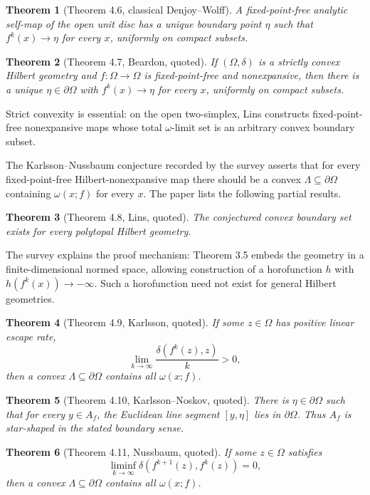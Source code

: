 \documentclass[11pt]{article}
\newtheorem{theorem}{Theorem}
\begin{document}
\begin{theorem}[Theorem 4.6, classical Denjoy--Wolff]
A fixed-point-free analytic self-map of the open unit disc has a unique boundary point
\(\eta\) such that \(f^k(x)\to\eta\) for every \(x\), uniformly on compact subsets.
\end{theorem}

\begin{theorem}[Theorem 4.7, Beardon, quoted]
If \((\Omega,\delta)\) is a strictly convex Hilbert geometry and
\(f:\Omega\to\Omega\) is fixed-point-free and nonexpansive, then there is a unique
\(\eta\in\partial\Omega\) with \(f^k(x)\to\eta\) for every \(x\), uniformly on compact subsets.
\end{theorem}
Strict convexity is essential: on the open two-simplex, Lins constructs fixed-point-free
nonexpansive maps whose total \(\omega\)-limit set is an arbitrary convex boundary subset.

The Karlsson--Nussbaum conjecture recorded by the survey asserts that for every fixed-point-free
Hilbert-nonexpansive map there should be a convex \(\Lambda\subseteq\partial\Omega\) containing
\(\omega(x;f)\) for every \(x\).  The paper lists the following partial results.

\begin{theorem}[Theorem 4.8, Lins, quoted]
The conjectured convex boundary set exists for every polytopal Hilbert geometry.
\end{theorem}
The survey explains the proof mechanism: Theorem 3.5 embeds the geometry in a finite-dimensional
normed space, allowing construction of a horofunction \(h\) with
\(h(f^k(x))\to-\infty\).  Such a horofunction need not exist for general Hilbert geometries.

\begin{theorem}[Theorem 4.9, Karlsson, quoted]
If some \(z\in\Omega\) has positive linear escape rate,
\[
 \lim_{k\to\infty}\frac{\delta(f^k(z),z)}k>0,
\]
then a convex \(\Lambda\subseteq\partial\Omega\) contains all \(\omega(x;f)\).
\end{theorem}

\begin{theorem}[Theorem 4.10, Karlsson--Noskov, quoted]
There is \(\eta\in\partial\Omega\) such that for every \(y\in A_f\), the Euclidean line segment
\([y,\eta]\) lies in \(\partial\Omega\).  Thus \(A_f\) is star-shaped in the stated boundary sense.
\end{theorem}

\begin{theorem}[Theorem 4.11, Nussbaum, quoted]
If some \(z\in\Omega\) satisfies
\[
 \liminf_{k\to\infty}\delta(f^{k+1}(z),f^k(z))=0,
\]
then a convex \(\Lambda\subseteq\partial\Omega\) contains all \(\omega(x;f)\).
\end{theorem}
\end{document}
